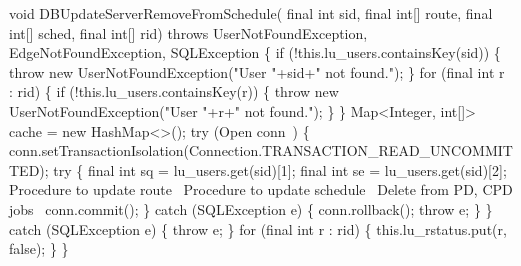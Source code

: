 void DBUpdateServerRemoveFromSchedule(
    final int sid, final int[] route, final int[] sched, final int[] rid)
throws UserNotFoundException, EdgeNotFoundException, SQLException \{
  if (!this.lu_users.containsKey(sid)) \{
    throw new UserNotFoundException("User "+sid+" not found.");
  \}
  for (final int r : rid) \{
    if (!this.lu_users.containsKey(r)) \{
      throw new UserNotFoundException("User "+r+" not found.");
    \}
  \}
  Map<Integer, int[]> cache = new HashMap<>();
  try (\LA{}Open \code{}conn\edoc{}~{\nwtagstyle{}}\RA{}) \{
    conn.setTransactionIsolation(Connection.TRANSACTION_READ_UNCOMMITTED);
    try \{
      final int sq = lu_users.get(sid)[1];
      final int se = lu_users.get(sid)[2];
      \LA{}Procedure to update route~{\nwtagstyle{}}\RA{}
      \LA{}Procedure to update schedule~{\nwtagstyle{}}\RA{}
      \LA{}Delete from PD, CPD jobs~{\nwtagstyle{}}\RA{}
      conn.commit();
    \} catch (SQLException e) \{
      conn.rollback();
      throw e;
    \}
  \} catch (SQLException e) \{
    throw e;
  \}
\eatline
{}\nwendcode{}
\nwenddocs{}\plusendmoddef
  for (final int r : rid) \{
    this.lu_rstatus.put(r, false);
  \}
\}
\nwendcode{}

